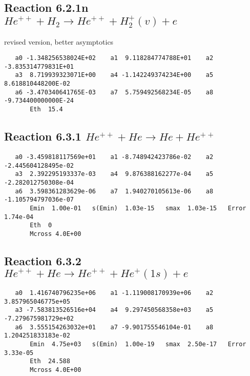 \documentclass[12pt,dvipdfmx]{article}
\begin{document}
\subsection{
Reaction 6.2.1n $   He^{++} + H_2 \rightarrow He^{++} + H_2^+(v) + e$}
revised version, better asymptotics

\begin{small}\begin{verbatim}
   a0 -1.348256538024E+02    a1  9.118284774788E+01    a2 -3.835314779831E+01
   a3  8.719939323071E+00    a4 -1.142249374234E+00    a5  8.618810448200E-02
   a6 -3.470340641765E-03    a7  5.759492568234E-05    a8 -9.734400000000E-24
       Eth  15.4
\end{verbatim}\end{small}


\newpage
\subsection{
Reaction 6.3.1 $   He^{++} + He \rightarrow He + He^{++}$}


\begin{small}\begin{verbatim}
   a0 -3.459818117569e+01    a1 -8.748942423786e-02    a2 -2.445604128495e-02
   a3  2.392295193337e-03    a4  9.876388162277e-04    a5 -2.282012750308e-04
   a6  3.598361283629e-06    a7  1.940270105613e-06    a8 -1.105794797036e-07
       Emin  1.00e-01   s(Emin)  1.03e-15   smax  1.03e-15   Error  1.74e-04
       Eth  0
       Mcross 4.0E+00
\end{verbatim}\end{small}

\newpage
\subsection{
Reaction 6.3.2 $   He^{++} + He \rightarrow He^{++} + He^+(1s) + e$}


\begin{small}\begin{verbatim}
   a0  1.416740796235e+06    a1 -1.119008170939e+06    a2  3.857965046775e+05
   a3 -7.583813526516e+04    a4  9.297450568358e+03    a5 -7.279675981729e+02
   a6  3.555154263032e+01    a7 -9.901755546104e-01    a8  1.204251833183e-02
       Emin  4.75e+03   s(Emin)  1.00e-19   smax  2.50e-17   Error 3.33e-05
       Eth  24.588
       Mcross 4.0E+00
\end{verbatim}\end{small}
\end{document}
